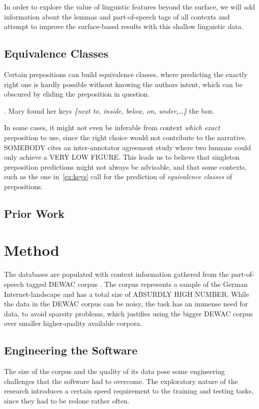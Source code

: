 \documentclass[draft,12pt]{article}
\begin{document}
In order to explore the value of linguistic features beyond the surface, we will
add information about the lemmas and part-of-speech tags of all contexts and
attempt to improve the surface-based results with this shallow linguistic data.

\subsection{Equivalence Classes} %
\label{sec:eqclass}              %
Certain prepositions can build equivalence classes, where
predicting the exactly right one is hardly possible without knowing the authors
intent, which can be obscured by eliding the preposition in question.

\ex. Mary found her keys \textit{\{next to, inside, below, on, under,\ldots{}\}} the box.
\label{ex:keys}

In some cases, it might not even be inferable from context \textit{which exact}
preposition to use, since the right choice would not contribute to the
narrative. SOMEBODY %
cites an inter-annotator agreement study where two humans could only achieve a
VERY LOW FIGURE. %
This leads us to believe that singleton preposition predictions might not always
be advisable, and that some contexts, such as the one in~\ref{ex:keys} call for
the prediction of \textit{equivalence classes} of prepositions.

\subsection{Prior Work}

\section{Method}

The databases are populated with context information gathered from the
part-of-speech tagged DEWAC corpus \citep{baroniETAL2008}. The corpus represents
a sample of the German Internet-landscape and has a total size of ABSURDLY HIGH
NUMBER. %
While the data in the DEWAC corpus can be noisy, the task has an immense need
for data, to avoid sparsity problems, which justifies using the bigger DEWAC
corpus over smaller higher-quality available corpora.

\subsection{Engineering the Software}
The size of the corpus and the quality of its data pose some engineering
challenges that the software had to overcome. The exploratory nature of the
research introduces a certain speed requirement to the training and testing
tasks, since they had to be redone rather often.
\end{document}
